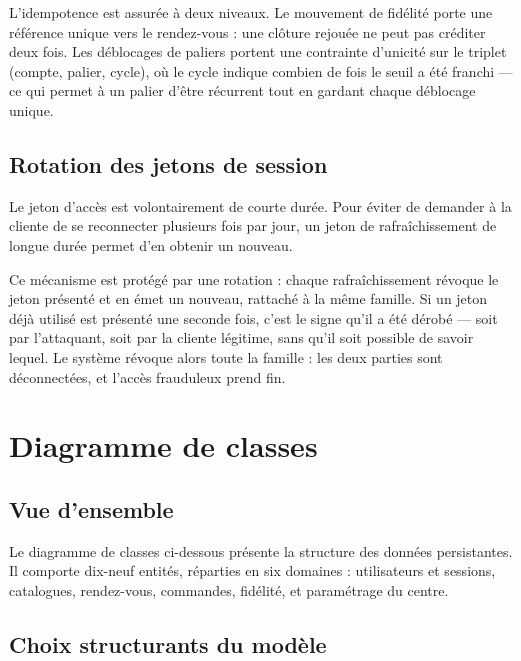 L'idempotence est assurée à deux niveaux. Le mouvement de fidélité porte une
référence unique vers le rendez-vous : une clôture rejouée ne peut pas créditer
deux fois. Les déblocages de paliers portent une contrainte d'unicité sur le
triplet (compte, palier, cycle), où le cycle indique combien de fois le seuil a
été franchi --- ce qui permet à un palier d'être récurrent tout en gardant
chaque déblocage unique.

\subsection{Rotation des jetons de session}


Le jeton d'accès est volontairement de courte durée. Pour éviter de demander à
la cliente de se reconnecter plusieurs fois par jour, un jeton de
rafraîchissement de longue durée permet d'en obtenir un nouveau.

Ce mécanisme est protégé par une rotation : chaque rafraîchissement révoque le
jeton présenté et en émet un nouveau, rattaché à la même famille. Si un jeton
déjà utilisé est présenté une seconde fois, c'est le signe qu'il a été
dérobé --- soit par l'attaquant, soit par la cliente légitime, sans qu'il soit
possible de savoir lequel. Le système révoque alors toute la famille : les deux
parties sont déconnectées, et l'accès frauduleux prend fin.

\section{Diagramme de classes}

\subsection{Vue d'ensemble}

Le diagramme de classes ci-dessous présente la structure des données
persistantes. Il comporte dix-neuf entités, réparties en six domaines :
utilisateurs et sessions, catalogues, rendez-vous, commandes, fidélité, et
paramétrage du centre.


\subsection{Choix structurants du modèle}

